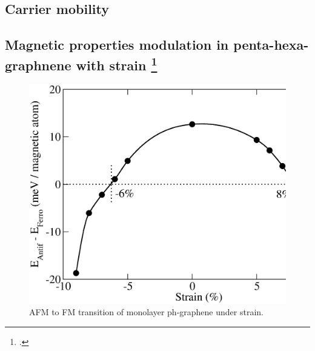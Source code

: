 %

\subsection{Carrier mobility}

\subsection[Magnetic properties modulation in penta-hexa-graphnene with strain]{Magnetic properties modulation in penta-hexa-graphnene with strain \footcite[This work is published in:][]{Aierken2016.magnetism}}

\begin{figure}[htbp]
\centering
\includegraphics[width=\linewidth]{FM_AFM.eps}%
\caption{AFM to FM transition of monolayer ph-graphene under strain. \label{transition}}
\end{figure}

